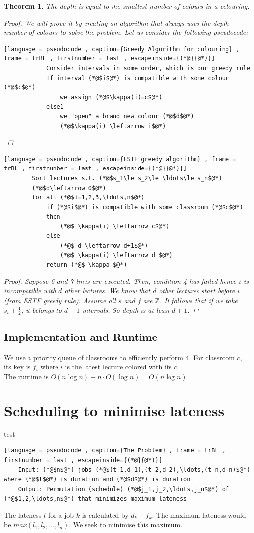 \documentclass[a4paper]{article}
\theoremstyle{plain}
\newtheorem{thm}{Theorem}[section]
\theoremstyle{definition}
\theoremstyle{remark}
\begin{document}
	\begin{thm}
		The depth is equal to the smallest number of colours in a colouring.
		\begin{proof} We will prove it by creating an algorithm that always uses the depth number of colours to solve the problem. Let us consider the following pseudocode:
			\begin{lstlisting}[language = pseudocode , caption={Greedy Algorithm for colouring} , frame = trBL , firstnumber = last , escapeinside={(*@}{@*)}]
			Consider intervals in some order, which is our greedy rule
			If interval (*@$i$@*) is compatible with some colour (*@$c$@*)
				we assign (*@$\kappa(i)=c$@*)
			else1
				we "open" a brand new colour (*@$d$@*)
				(*@$\kappa(i) \leftarrow i$@*)
			\end{lstlisting}
		\end{proof}
		\begin{lstlisting}[language = pseudocode , caption={ESTF greedy algorithm} , frame = trBL , firstnumber = last , escapeinside={(*@}{@*)}]
		Sort lectures s.t. (*@$s_1\le s_2\le \ldots\le s_n$@*)
		(*@$d\leftarrow 0$@*)
		for all (*@$i=1,2,3,\ldots,n$@*)
			if (*@$i$@*) is compatible with some classroom (*@$c$@*)
			then
				(*@$ \kappa(i) \leftarrow c$@*)
			else
				(*@$ d \leftarrow d+1$@*)
				(*@$ \kappa(i) \leftarrow d $@*)
			return (*@$ \kappa $@*)
		\end{lstlisting}
		\begin{proof}
			Suppose 6 and 7 lines are executed. Then, condition 4 has failed hence $i$ is incompatible with $d$ other lectures. We know that $d$ other lectures start before $i$ (from ESTF greedy rule). Assume all $s$ and $f$ are $\mathbb{Z}$. It follows that if we take $s_i+\frac{1}{2}$, it belongs to $d+1$ intervals. So depth is at least $d+1$. 
		\end{proof}
	\end{thm}
	\subsection{Implementation and Runtime}
	We use a priority queue of classrooms to efficiently perform $4$. For classroom $c$, its key is $f_i$ where $i$ is the latest lecture colored with its $c$.  \\
	The runtime is $O(n \log n) + n \cdot O(\log n)  = O(n \log n)$ 
	\section{Scheduling to minimise lateness}
	test
	\begin{lstlisting}[language = pseudocode , caption={The Problem} , frame = trBL , firstnumber = last , escapeinside={(*@}{@*)}]
	Input: (*@$n$@*) jobs (*@$(t_1,d_1),(t_2,d_2),\ldots,(t_n,d_n)$@*) where (*@$t$@*) is duration and (*@$d$@*) is duration
	Output: Permutation (schedule) (*@$j_1,j_2,\ldots,j_n$@*) of (*@$1,2,\ldots,n$@*) that minimizes maximum lateness
	\end{lstlisting}
	The lateness $l$ for a job $k$ is calculated by $d_k - f_k$. The maximum lateness would be $max(l_1,l_2,\ldots,l_n)$. We seek to minimise this maximum.
\end{document}
